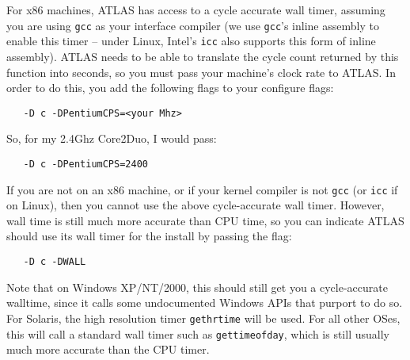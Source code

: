 \documentclass[11pt]{article}
\begin{document}
For x86 machines, ATLAS has access to a cycle accurate wall timer, assuming
you are using {\tt gcc} as your interface compiler (we use {\tt gcc}'s inline
assembly to enable this timer -- under Linux, Intel's {\tt icc} also supports
this form of inline
assembly).  ATLAS needs to be able to translate the cycle count returned by
this function into seconds, so you must pass your machine's clock rate to
ATLAS.  In order to do this, you add the following flags to your 
configure flags:
\vspace*{-0.1in}
\begin{verbatim}
   -D c -DPentiumCPS=<your Mhz>
\end{verbatim}
So, for my 2.4Ghz Core2Duo, I would pass:
\vspace*{-0.1in}
\begin{verbatim}
   -D c -DPentiumCPS=2400
\end{verbatim}

If you are not on an x86 machine, or if your kernel compiler is not {\tt gcc}
(or {\tt icc} if on Linux), then you cannot use the above cycle-accurate
wall timer.  However, wall time is still much more accurate than CPU time,
so you can indicate ATLAS should use its wall timer for the install by passing
the flag:
\vspace*{-0.1in}
\begin{verbatim}
   -D c -DWALL
\end{verbatim}

Note that on Windows XP/NT/2000, this should still get you a cycle-accurate
walltime, since it calls some undocumented Windows APIs that purport to do so. 
For Solaris, the high resolution timer {\tt gethrtime} will be used.  For
all other OSes, this will call a standard wall timer such as {\tt gettimeofday},
which is still usually much more accurate than the CPU timer.
\end{document}
